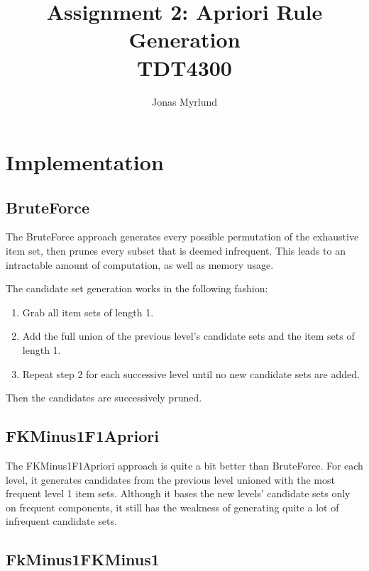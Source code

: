 \documentclass[11pt,a4paper]{article}
\begin{document}
\title{Assignment 2: Apriori Rule Generation \\ \large{TDT4300}}
\author{Jonas Myrlund}

\maketitle

\section{Implementation}

\subsection{BruteForce}

The BruteForce approach generates every possible permutation of the exhaustive item set, then prunes every subset that is deemed infrequent. This leads to an intractable amount of computation, as well as memory usage.

The candidate set generation works in the following fashion:

\begin{enumerate}
  \item Grab all item sets of length 1.
  \item Add the full union of the previous level's candidate sets and the item sets of length 1.
  \item Repeat step 2 for each successive level until no new candidate sets are added.
\end{enumerate}

Then the candidates are successively pruned.

\subsection{FKMinus1F1Apriori}

The FKMinus1F1Apriori approach is quite a bit better than BruteForce. For each level, it generates candidates from the previous level unioned with the most frequent level 1 item sets. Although it bases the new levels' candidate sets only on frequent components, it still has the weakness of generating quite a lot of infrequent candidate sets.

\subsection{FkMinus1FKMinus1}
\end{document}
